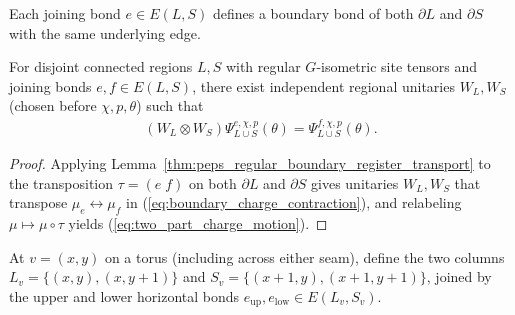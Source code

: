 \begin{definition}
    \label{def:peps_joining_boundary_edge}
    \leanok
    Each joining bond $e\in E(L,S)$ defines a boundary bond of both $\partial L$ and $\partial S$ with the same underlying edge.
\end{definition}

\begin{lemma}
    \label{thm:peps_regular_two_part_charge_motion}
    \leanok
    For disjoint connected regions $L,S$ with regular $G$-isometric site tensors and joining bonds $e,f\in E(L,S)$, there exist independent regional unitaries $W_L,W_S$ (chosen before $\chi,p,\theta$) such that
    \begin{align}
        (W_L\otimes W_S)\Psi_{L\cup S}^{e,\chi,p}(\theta)
        =\Psi_{L\cup S}^{f,\chi,p}(\theta). \label{eq:two_part_charge_motion}
    \end{align}
\end{lemma}
\begin{proof}\leanok
    Applying Lemma~\ref{thm:peps_regular_boundary_register_transport} to the transposition $\tau=(e\;f)$ on both $\partial L$ and $\partial S$ gives unitaries $W_L,W_S$ that transpose $\mu_e\leftrightarrow\mu_f$ in (\ref{eq:boundary_charge_contraction}), and relabeling $\mu\mapsto\mu\circ\tau$ yields (\ref{eq:two_part_charge_motion}).
\end{proof}

\begin{definition}
    \label{def:peps_torus_two_column_charge_geometry}
    \leanok
    At $v=(x,y)$ on a torus (including across either seam), define the two columns $L_v=\{(x,y),(x,y+1)\}$ and $S_v=\{(x+1,y),(x+1,y+1)\}$, joined by the upper and lower horizontal bonds $e_{\mathrm{up}},e_{\mathrm{low}}\in E(L_v,S_v)$.
\end{definition}

